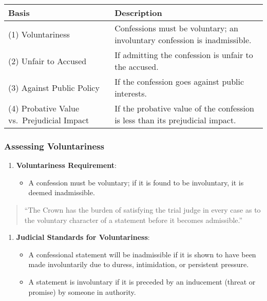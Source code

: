 \begin{longtable}[]{@{}
  >{\raggedright\arraybackslash}p{}
  >{\raggedright\arraybackslash}p{}@{}}
\toprule\noalign{}
\begin{minipage}[b]{\linewidth}\raggedright
Basis
\end{minipage} & \begin{minipage}[b]{\linewidth}\raggedright
Description
\end{minipage} \\
\midrule\noalign{}
\endhead
\bottomrule\noalign{}
\endlastfoot
(1) Voluntariness & Confessions must be voluntary; an involuntary
confession is inadmissible. \\
(2) Unfair to Accused & If admitting the confession is unfair to the
accused. \\
(3) Against Public Policy & If the confession goes against public
interests. \\
(4) Probative Value vs.~Prejudicial Impact & If the probative value of
the confession is less than its prejudicial impact. \\
\end{longtable}

\subsubsection{Assessing Voluntariness}\label{assessing-voluntariness}

\begin{enumerate}
\def\labelenumi{\arabic{enumi}.}
\tightlist
\item
  \textbf{Voluntariness Requirement}:

  \begin{itemize}
  \tightlist
  \item
    A confession must be voluntary; if it is found to be involuntary, it
    is deemed inadmissible.
  \end{itemize}
\end{enumerate}

\begin{quote}
``The Crown has the burden of satisfying the trial judge in every case
as to the voluntary character of a statement before it becomes
admissible.''
\end{quote}

\begin{enumerate}
\def\labelenumi{\arabic{enumi}.}
\setcounter{enumi}{1}
\tightlist
\item
  \textbf{Judicial Standards for Voluntariness}:

  \begin{itemize}
  \tightlist
  \item
    A confessional statement will be inadmissible if it is shown to have
    been made involuntarily due to duress, intimidation, or persistent
    pressure.
  \item
    A statement is involuntary if it is preceded by an inducement
    (threat or promise) by someone in authority.
  \end{itemize}
\end{enumerate}


